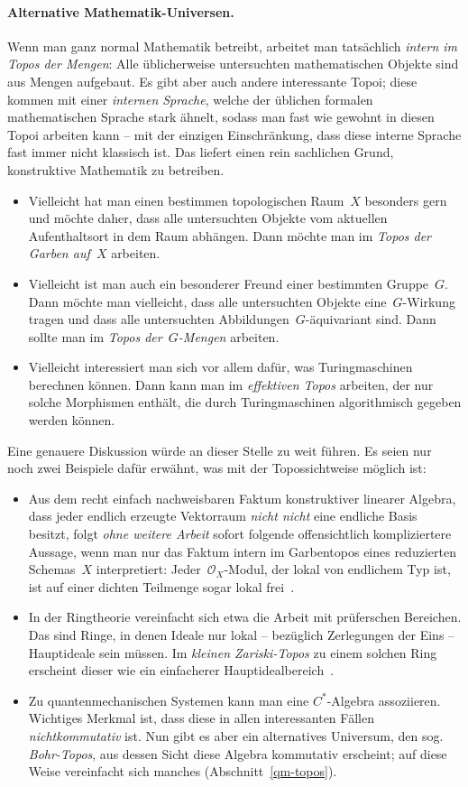 \documentclass[a4paper,ngerman,12pt]{scrartcl}
\theoremstyle{definition}
\theoremstyle{plain}
\theoremstyle{remark}
\renewcommand{\O}{\mathcal{O}}
\renewcommand{\_}{\mathpunct{.}\,}
\newcommand{\?}{\,{:}\,}
\begin{document}
\paragraph{Alternative Mathematik-Universen.} Wenn man ganz normal Mathematik
betreibt, arbeitet man tatsächlich \emph{intern im Topos der Mengen}: Alle
üblicherweise untersuchten mathematischen Objekte sind aus Mengen aufgebaut. Es gibt
aber auch andere interessante Topoi; diese kommen mit einer \emph{internen
Sprache}, welche der üblichen formalen mathematischen Sprache stark
ähnelt, sodass man fast wie gewohnt in diesen Topoi arbeiten kann -- mit der einzigen
Einschränkung, dass diese interne Sprache fast immer nicht klassisch ist. Das
liefert einen rein sachlichen Grund, konstruktive Mathematik zu betreiben.
\begin{itemize}
\item Vielleicht hat man einen bestimmen topologischen Raum~$X$ besonders gern
und möchte daher, dass alle untersuchten Objekte vom aktuellen Aufenthaltsort
in dem Raum abhängen. Dann möchte man im \emph{Topos der Garben auf~$X$}
arbeiten.
\item Vielleicht ist man auch ein besonderer Freund einer bestimmten
Gruppe~$G$. Dann möchte man vielleicht, dass alle untersuchten Objekte
eine~$G$-Wirkung tragen und dass alle untersuchten Abbildungen~$G$-äquivariant
sind. Dann sollte man im \emph{Topos der~$G$-Mengen} arbeiten.
\item Vielleicht interessiert man sich vor allem dafür, was Turingmaschinen
berechnen können. Dann kann man im \emph{effektiven Topos} arbeiten, der nur
solche Morphismen enthält, die durch Turingmaschinen algorithmisch gegeben
werden können.
\end{itemize}
Eine genauere Diskussion würde an dieser Stelle zu weit
führen. Es seien nur noch zwei Beispiele dafür erwähnt, was mit der Topossichtweise
möglich ist:
\begin{itemize}
\item Aus dem recht einfach nachweisbaren Faktum konstruktiver linearer
Algebra, dass jeder endlich erzeugte Vektorraum \emph{nicht nicht} eine endliche
Basis besitzt, folgt \emph{ohne weitere Arbeit} sofort folgende offensichtlich
kompliziertere Aussage, wenn man nur das Faktum intern im Garbentopos eines reduzierten
Schemas~$X$ interpretiert: Jeder~$\O_X$-Modul, der lokal von endlichem Typ ist,
ist auf einer dichten Teilmenge sogar lokal
frei~\cite{blechschmidt:internal-methods}.
\item In der Ringtheorie vereinfacht sich etwa die Arbeit mit prüferschen
Bereichen. Das sind Ringe, in denen Ideale nur lokal -- bezüglich Zerlegungen
der Eins -- Hauptideale sein müssen. Im \emph{kleinen Zariski-Topos} zu einem
solchen Ring erscheint dieser wie ein einfacherer
Hauptidealbereich~\cite{pizzaseminar:zariski}.
\item Zu quantenmechanischen Systemen kann man eine $C^*$-Algebra assoziieren.
Wichtiges Merkmal ist, dass diese in allen interessanten Fällen
\emph{nichtkommutativ} ist. Nun gibt es aber ein alternatives Universum,
den sog. \emph{Bohr-Topos}, aus dessen Sicht diese Algebra kommutativ erscheint; auf
diese Weise vereinfacht sich manches (Abschnitt~\ref{qm-topos}).
\end{itemize}
\end{document}
